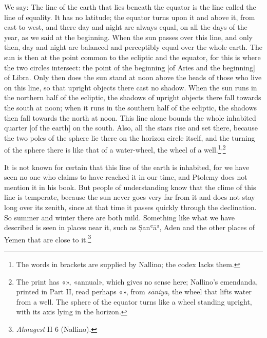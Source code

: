 \documentclass[11pt]{article}
\newcommand{\ArPage}[1]{\marginpar{\footnotesize\color{gray}Ar.\,p.\,#1}}
\begin{document}
\par We say: The line of the earth that lies beneath the equator is the line called the line of equality. It has no latitude; the equator turns upon it and above it, from east to west, and there day and night are always equal, on all the days of the year, as we said at the beginning. When the sun passes over this line, and only then, day and night are balanced and perceptibly equal over the whole earth. The sun is then at the point common to the ecliptic and the equator, for this is where the two circles intersect: the point of the beginning [of Aries and the beginning] of Libra. Only then does the sun stand at noon above the heads of those who live on this line, so that upright objects there cast no shadow. When the sun runs in the northern half of the ecliptic, the shadows of upright objects there fall towards the south at noon; when it runs in the southern half of the ecliptic, the shadows then fall towards the north at noon. This line alone bounds the whole inhabited quarter [of the earth] on the south. Also, all the stars rise and set there, because the two poles of the sphere lie there on the horizon circle itself, and the turning of the sphere there is like that of a water-wheel, the wheel of a well.\footnote{The words in brackets are supplied by Nallino; the codex lacks them.}\textsuperscript{,}\footnote{The print has «», «annual», which gives no sense here; Nallino's emendanda, printed in Part II, read perhaps «», from \emph{sāniya}, the wheel that lifts water from a well. The sphere of the equator turns like a wheel standing upright, with its axis lying in the horizon.}\par
\par \ArPage{22}It is not known for certain that this line of the earth is inhabited, for we have seen no one who claims to have reached it in our time, and Ptolemy does not mention it in his book. But people of understanding know that the clime of this line is temperate, because the sun never goes very far from it and does not stay long over its zenith, since at that time it passes quickly through the declination. So summer and winter there are both mild. Something like what we have described is seen in places near it, such as Ṣanʿāʾ, Aden and the other places of Yemen that are close to it.\footnote{\emph{Almagest} II 6 (Nallino).}\par
\end{document}
